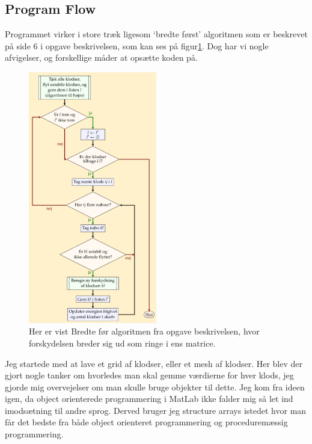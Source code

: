 \documentclass[11pt]{article}
\begin{document}
\subsection{Program Flow} %
\label{sub:program_flow}
Programmet virker i store træk ligesom `bredte først' algoritmen som er beskrevet på side 6 i opgave beskrivelsen, som kan ses på figur\ref{fig:bredte}. Dog har vi nogle afvigelser, og forskellige måder at opsætte koden på. 
\begin{figure}
  \caption{Her er vist Bredte før algoritmen fra opgave beskrivelsen, hvor forskydelsen breder sig ud som ringe i ens matrice.}
  \label{fig:bredte}
  \centering
    \includegraphics[width=0.5\textwidth]{bredteForst.png}
\end{figure}

Jeg startede med at lave et grid af klodser, eller et mesh af klodser. Her blev der gjort nogle tanker om hvorledes man skal gemme værdierne for hver klods, jeg gjorde mig overvejelser om man skulle bruge objekter til dette. \tabularnewline
Jeg kom fra ideen igen, da object orienterede programmering i MatLab ikke falder mig så let ind imodsætning til andre sprog. Derved bruger jeg structure arrays istedet hvor man får det bedste fra både object orienteret programmering og proceduremæssig programmering. \\
	
\end{document}
